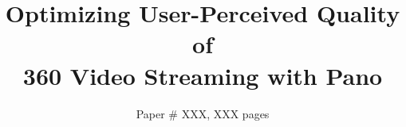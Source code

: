 \documentclass[sigconf]{acmart}
\newcommand{\jc}[1]{{\color{blue}{\footnotesize[JC: #1]}}}
\newcommand{\name}{{Pano}\xspace}
\newcommand{\vr}{{360\textdegree}\xspace}
\begin{document}
\title{Optimizing User-Perceived Quality of\\ \vr Video Streaming with \name}


\author{Paper \# XXX, XXX pages}

\renewcommand{\shortauthors}{X.et al.}

\begin{abstract}

\end{abstract}

\maketitle







\newpage
\jc{filling text to resolve vbox errors}





\end{document}
